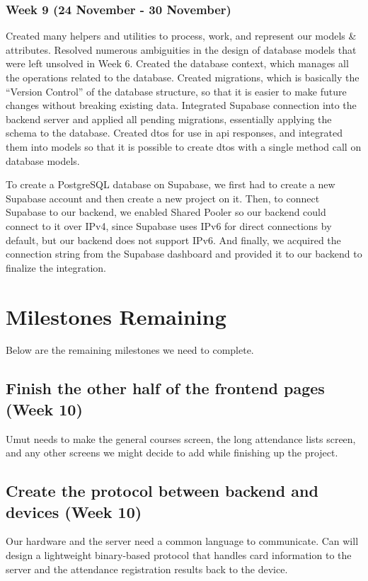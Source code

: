 \documentclass[12pt]{article}
\begin{document}
\subsubsection{Week 9 (24 November - 30 November)}
Created many helpers and utilities to process, work, and represent our models \& attributes. Resolved numerous ambiguities in the design of database models that were left unsolved in Week 6. Created the database context, which manages all the operations related to the database. Created migrations, which is basically the “Version Control” of the database structure, so that it is easier to make future changes without breaking existing data. Integrated Supabase connection into the backend server and applied all pending migrations, essentially applying the schema to the database. Created \glspl{dto} for use in \gls{api} responses, and integrated them into models so that it is possible to create \glspl{dto} with a single method call on database models.\par
To create a PostgreSQL database on Supabase, we first had to create a new Supabase account and then create a new project on it. Then, to connect Supabase to our backend, we enabled Shared Pooler\supercite{supabase-connect} so our backend could connect to it over IPv4, since Supabase uses IPv6 for direct connections by default, but our backend does not support IPv6.
And finally, we acquired the connection string from the Supabase dashboard and provided it to our backend to finalize the integration.



\newpage
\section{Milestones Remaining}
Below are the remaining milestones we need to complete.


\subsection{Finish the other half of the frontend pages (Week 10)}
Umut needs to make the general courses screen, the long attendance lists screen, and any other screens we might decide to add while finishing up the project.


\subsection{Create the protocol between backend and devices (Week 10)}
Our hardware and the server need a common language to communicate. Can will design a lightweight binary-based protocol that handles card information to the server and the attendance registration results back to the device.
\end{document}
